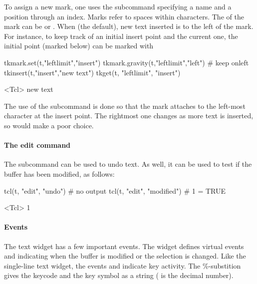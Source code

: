 To assign a new mark, one uses the 
subcommand specifying a name and a position through an index. Marks
refer to spaces within characters. The  of the mark can
be  or . When  (the default), new
text inserted is to the left of the mark. For instance, to keep track
of an initial insert point and the current one, the initial point
(marked  below) can be marked with
\begin{Schunk}
\begin{Sinput}
 tkmark.set(t,"leftlimit","insert")
 tkmark.gravity(t,"leftlimit","left")    # keep onleft
 tkinsert(t,"insert","new text")
 tkget(t, "leftlimit", "insert")
\end{Sinput}
\begin{Soutput}
<Tcl> new text 
\end{Soutput}
\end{Schunk}
%
The use of the subcommand  is done so
that the mark attaches to the left-most character at the insert
point. The rightmost one changes as more text is inserted, so would
make a poor choice.


\paragraph{The edit command}
The subcommand  can be used to undo text. As well, it can be used to test if the buffer has been modified, as follows:
\begin{Schunk}
\begin{Sinput}
 tcl(t, "edit", "undo")                  # no output
 tcl(t, "edit", "modified")              # 1 = TRUE
\end{Sinput}
\begin{Soutput}
<Tcl> 1 
\end{Soutput}
\end{Schunk}



\paragraph{Events}
The text widget has a few important events.  The widget defines
virtual events  and
 indicating when the buffer is modified
or the selection is changed. Like the single-line text widget, the
events  and  indicate
key activity. The \%-substition  gives the keycode and
 the key symbol as a string ( is the decimal number).




